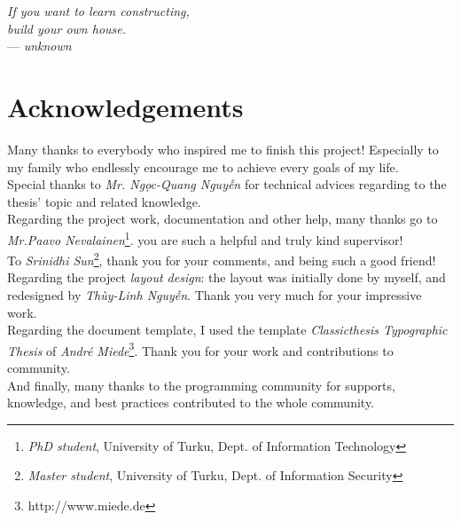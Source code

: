 

\begin{flushright}{\slshape    
If you want to learn constructing, \\
build your own house.} \\ \medskip
--- \emph{unknown}
\end{flushright}

\bigskip


\begingroup

\let\clearpage\relax
\let\cleardoublepage\relax
\let\cleardoublepage\relax

\chapter*{Acknowledgements} %

\noindent Many thanks to everybody who inspired me to finish this project! 
Especially to my family who endlessly encourage me to achieve every goals of my life.  \\

\noindent Special thanks to \emph{Mr. Ng\d{o}c-Quang Nguy\~{\^{e}}n} for technical advices regarding to the thesis' topic and related knowledge. \\

\noindent Regarding the project work, documentation and other help, many thanks go to \emph{Mr.Paavo Nevalainen}\footnote{\emph{PhD student}, University of Turku,  Dept. of Information Technology}. you are such a helpful and truly kind supervisor! \\

\noindent To \emph{Srinidhi Sun}\footnote{\emph{Master student}, University of Turku,  Dept. of Information Security}, thank you for your comments, and being such a good friend! \\

\noindent Regarding the project \emph{layout design}: the layout was initially done by myself, and redesigned by \emph{Th\`{u}y-Linh Nguy\~{\^{e}}n}. Thank you very much for your impressive work.\\

\noindent Regarding the document template, I used the \latex template \emph{Classicthesis Typographic Thesis} of \emph{Andr\'{e} Miede}\footnote{http://www.miede.de}. Thank you for your work and contributions to \latex community.\\

And finally, many thanks to the programming community for supports, knowledge, and best practices contributed to the whole community.

\endgroup
